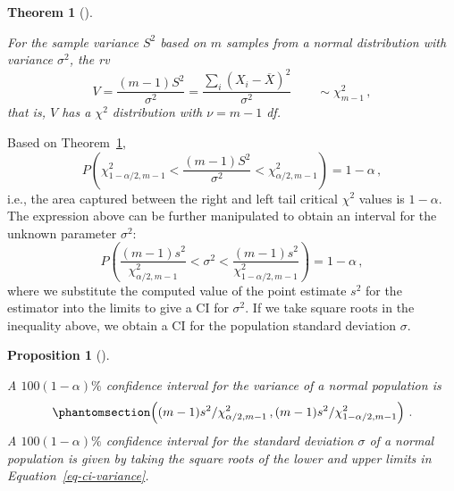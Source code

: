 \documentclass[
  a4paper,
  DIV=11,
  numbers=noendperiod,
  oneside]{scrreprt}
\theoremstyle{plain}
\newtheorem{theorem}{Theorem}[chapter]
\theoremstyle{definition}
\theoremstyle{definition}
\theoremstyle{definition}
\theoremstyle{plain}
\newtheorem{proposition}{Proposition}[chapter]
\theoremstyle{remark}
\begin{document}
\begin{theorem}[]\protect\hypertarget{thm-samp-var-chisq}{}\label{thm-samp-var-chisq}

For the sample variance \(S^2\) based on \(m\) samples from a normal
distribution with variance \(\sigma^2\), the rv \[
V = \frac{(m-1)S^2}{\sigma^2} = \frac{\sum_i(X_i - \overline{X})^2}{\sigma^2} \qquad \sim \chi^2_{m-1}\,,
\] that is, \(V\) has a \(\chi^2\) distribution with \(\nu = m-1\) df.

\end{theorem}

Based on Theorem~\ref{thm-samp-var-chisq}, \[
P\left(\chi^2_{1-\alpha/2, m-1} < \frac{(m-1)S^2}{\sigma^2} < \chi^2_{\alpha/2, m-1} \right) = 1 - \alpha \,,
\] i.e., the area captured between the right and left tail critical
\(\chi^2\) values is \(1-\alpha.\) The expression above can be further
manipulated to obtain an interval for the unknown parameter
\(\sigma^2\): \[
P\left(\frac{(m-1) s^2}{\chi^2_{\alpha/2, m-1}} < \sigma^2 < \frac{(m-1) s^2}{\chi^2_{1-\alpha/2, m-1}} \right) = 1 - \alpha \,,
\] where we substitute the computed value of the point estimate \(s^2\)
for the estimator into the limits to give a CI for \(\sigma^2.\) If we
take square roots in the inequality above, we obtain a CI for the
population standard deviation \(\sigma.\)

\begin{proposition}[]\protect\hypertarget{prp-ci-variance}{}\label{prp-ci-variance}

A \(100(1-\alpha)\%\) confidence interval for the variance of a normal
population is \begin{equation}\phantomsection\label{eq-ci-variance}{
 \left( (m-1)s^2 / \chi^2_{\alpha/2, m-1} \,,  (m-1)s^2 / \chi^2_{1-\alpha/2, m-1} \right) \,.
}\end{equation} A \(100(1-\alpha)\%\) confidence interval for the
standard deviation \(\sigma\) of a normal population is given by taking
the square roots of the lower and upper limits in
Equation~\ref{eq-ci-variance}.

\end{proposition}
\end{document}
